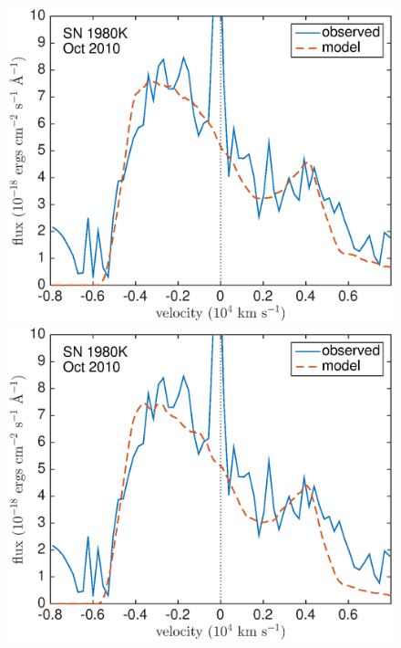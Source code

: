 \begin{figure}
\centering
\includegraphics[scale=0.4,clip=true, trim=20 0 40 20]{chapters/chapter6/figs/80K/clumped/Ha}
\includegraphics[scale=0.4,clip=true, trim=20 0 40 20]{chapters/chapter6/figs/80K/clumped/Ha_amC}


\end{figure}
